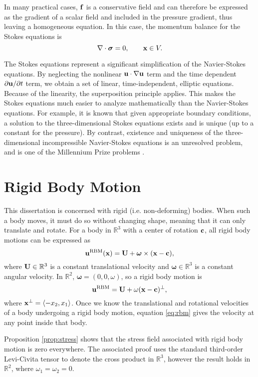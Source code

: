In many practical cases, ${\mathbf{f}}$ is a conservative field and can therefore be expressed as the gradient of a scalar field and included in the pressure gradient, thus leaving a homogeneous equation. In this case, the momentum balance for the Stokes equations is
\[ \nabla\cdot{\boldsymbol\sigma} = 0, \qquad {\mathbf{x}} \in V.\]

The Stokes equations represent a significant simplification of the Navier-Stokes equations. By neglecting the nonlinear ${\mathbf{u}}\cdot\nabla{\mathbf{u}}$ term and the time dependent $\partial{\mathbf{u}}/\partial t$ term, we obtain a set of linear, time-independent, elliptic equations. Because of the linearity, the superposition principle applies. This makes the Stokes equations much easier to analyze mathematically than the Navier-Stokes equations. For example, it is known that given appropriate boundary conditions, a solution to the three-dimensional Stokes equations exists and is unique (up to a constant for the pressure). By contrast, existence and uniqueness of the three-dimensional incompressible Navier-Stokes equations is an unresolved problem, and is one of the Millennium Prize problems \cite{Carlson2006}.

\section{Rigid Body Motion}

This dissertation is concerned with rigid (i.e. non-deforming) bodies. When such a body moves, it must do so without changing shape, meaning that it can only translate and rotate. For a body in $\mathbb{R}^3$ with a center of rotation ${\mathbf{c}}$, all rigid body motions can be expressed as
\begin{equation}\label{eq:rbm}{\mathbf{u}}^{\text{RBM}}({\mathbf{x}}) = {\mathbf{U}} + \bm{\omega}\times({\mathbf{x}} - {\mathbf{c}}),\end{equation}
where ${\mathbf{U}}\in\mathbb{R}^3$ is a constant translational velocity and $\bm{\omega}\in\mathbb{R}^3$ is a constant angular velocity. In $\mathbb{R}^2$, $\bm{\omega} = (0, 0, \omega)$, so a rigid body motion is 
\[ {\mathbf{u}}^{\text{RBM}} = {\mathbf{U}} + \omega({\mathbf{x}} - {\mathbf{c}})^\perp,\]
where ${\mathbf{x}}^\perp = \langle -x_2, x_1\rangle$. Once we know the translational and rotational velocities of a body undergoing a rigid body motion, equation \eqref{eq:rbm} gives the velocity at any point inside that body. 

Proposition \ref{prop:stress} shows that the stress field associated with rigid body motion is zero everywhere. The associated proof uses the standard third-order Levi-Civita tensor to denote the cross product in $\mathbb{R}^3$, however the result holds in $\mathbb{R}^2$, where $\omega_1 = \omega_2 = 0$. 

